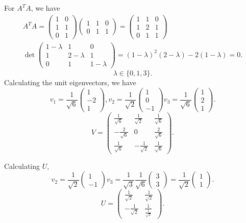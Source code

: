 \documentclass[5pt, a4paper]{article}
\begin{document}
For $A^{T}A$, we have 
\begin{align*}
    A^{T}A = \begin{pmatrix} 1 & 0 \\ 1 & 1 \\ 0 & 1 \end{pmatrix}
    \begin{pmatrix} 1 & 1 & 0 \\ 0 & 1 & 1 \end{pmatrix} = 
    \begin{pmatrix} 1 & 1 & 0 \\ 1 & 2 & 1 \\ 0 & 1 & 1 \end{pmatrix} \\
    \det \begin{pmatrix} 1 - \lambda & 1 & 0 \\ 1 & 2 - \lambda & 1 \\ 0 & 1 & 1
    - \lambda \end{pmatrix}
                           = (1 - \lambda)^2 (2 - \lambda) - 2(1-\lambda) = 0
.\end{align*}
\[
\lambda \in \{0,1,3\} 
.\] 
Calculating the unit eigenvectors, we have 
\[
v_1 = \frac{1}{\sqrt{6} }\begin{pmatrix} 1 \\ -2 \\ 1 \end{pmatrix},
v_2 = \frac{1}{\sqrt{2} }\begin{pmatrix} 1 \\ 0 \\ -1 \end{pmatrix} 
v_3 = \frac{1}{\sqrt{6} }\begin{pmatrix} 1 \\ 2 \\ 1 \end{pmatrix} 
.\] 
\[
V = 
\begin{pmatrix} 
    \frac{1}{\sqrt{6} } & \frac{1}{\sqrt{2} } & \frac{1}{\sqrt{6} } \\ 
    -\frac{2}{\sqrt{6} } & 0 & \frac{2}{\sqrt{6} } \\
    \frac{1}{\sqrt{6} } & -\frac{1}{\sqrt{2} } & \frac{1}{\sqrt{6} }    
\end{pmatrix} 
.\] 

Calculating $U$, 
 \[
     v_2 = \frac{1}{\sqrt{2} } \begin{pmatrix} 1 \\ -1 \end{pmatrix} 
     v_3 = \frac{1}{\sqrt{3} } \frac{1}{\sqrt{6} } \begin{pmatrix} 3 \\ 3
     \end{pmatrix} = \frac{1}{\sqrt{2} } \begin{pmatrix} 1 \\ 1 \end{pmatrix} 
.\] 
\[
    U = 
    \begin{pmatrix} 
        \frac{1}{\sqrt{2} } & \frac{1}{\sqrt{2} } \\ 
        -\frac{1}{\sqrt{2} } & \frac{1}{\frac{1}{\sqrt{2} }}     
    \end{pmatrix} 
.\] 
\end{document}
